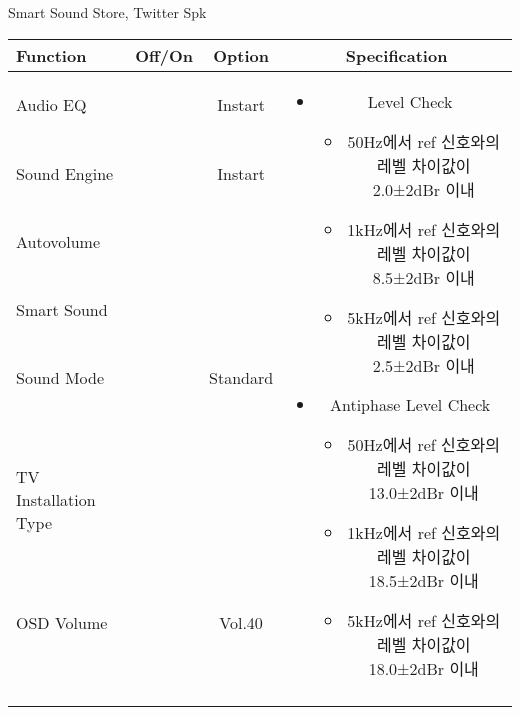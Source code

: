 \begin{frame}[t]{Smart Sound Store, Twitter Spk}
\begin{tiny}
\begin{tabular}{@{}lccc@{}}
\toprule
Function & Off/On & Option & Specification \\
\midrule
Audio EQ & \color{black}{Off} & Instart &
\multirow{10}{60mm}{
\begin{itemize}
	\item Level Check
	\begin{itemize}
		\item 50Hz에서 ref 신호와의 레벨 차이값이 2.0±2dBr 이내
		\item 1kHz에서 ref 신호와의 레벨 차이값이 8.5±2dBr 이내
		\item 5kHz에서 ref 신호와의 레벨 차이값이 2.5±2dBr 이내
	\end{itemize}
	\item Antiphase Level Check
	\begin{itemize}
		\item 50Hz에서 ref 신호와의 레벨 차이값이 13.0±2dBr 이내
		\item 1kHz에서 ref 신호와의 레벨 차이값이 18.5±2dBr 이내
		\item 5kHz에서 ref 신호와의 레벨 차이값이 18.0±2dBr 이내
	\end{itemize}
\end{itemize}
} \\
Sound Engine & \color{blue}{On} & Instart & \\
Autovolume & \color{black}{Off} & & \\
Smart Sound & \color{blue}{On} & & \\
Sound Mode & \color{blue}{On} & Standard & \\
TV Installation Type & \color{blue}{On} & \color{black}{Standtype1} & \\
OSD Volume & \color{blue}{On} & Vol.40 & \\
& & & \\
& & & \\
& & & \\
& & & \\
\midrule
\end{tabular}
\end{tiny}

\end{frame}